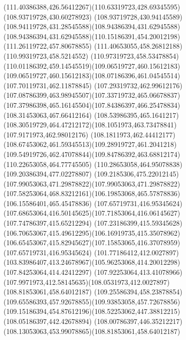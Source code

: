 {{	\curveto(111.40386388,426.56412267)(110.63319723,428.69345595)(108.93719728,430.60278923)
	\curveto(108.93719728,430.94145589)(108.94119728,431.28545588)(108.94386394,431.62945588)
	\curveto(108.94386394,431.62945588)(110.15186391,454.20012198)(111.26119722,457.80678855)
	\lineto(111.40653055,458.26812188)
	\lineto(110.99319723,458.5214552)
	\curveto(110.97319723,458.53478854)(110.01186392,459.14545519)(109.06519727,460.15612183)
	\curveto(109.06519727,460.15612183)(108.07186396,461.04545514)(107.70119731,462.11878845)
	\curveto(107.29319732,462.99612176)(107.08786399,463.98945507)(107.33719732,465.06678837)
	\curveto(107.37986398,465.16145504)(107.84386397,466.25478834)(108.31453063,467.66412164)
	\lineto(108.53986395,465.1641217)
	\curveto(108.30519729,464.47212172)(108.1051973,463.73478841)(107.9171973,462.98012176)
	\curveto(108.1811973,462.44412177)(108.67453062,461.59345513)(109.28919727,461.2041218)
	\curveto(109.54919726,462.47078844)(109.84786392,463.68812174)(110.22653058,464.77745505)
	\lineto(110.28653058,464.95078838)
	\lineto(109.20386394,477.02278807)
	\curveto(109.2185306,475.22012145)(107.99053063,471.29878822)(107.99053063,471.29878822)
	\curveto(107.58253064,468.83212161)(106.19853068,465.57878836)(106.15586401,465.45478836)
	\moveto(107.65719731,416.95345624)
	\curveto(107.68653064,416.50145625)(107.71853064,416.06145627)(107.74786397,415.65212294)
	\curveto(107.23186399,415.59345628)(106.70653067,415.49612295)(106.16919735,415.35078962)
	\curveto(106.65453067,415.82945627)(107.15853065,416.37078959)(107.65719731,416.95345624)
	\moveto(101.77186412,412.0027897)
	\curveto(103.83986407,413.24678967)(105.96253068,414.20012298)(107.84253064,414.42412297)
	\curveto(107.92253064,413.41078966)(107.9971973,412.58145635)(108.0531973,412.0027897)
	\closepath
	\moveto(108.81853061,458.64012187)
	\curveto(109.25586394,458.23878854)(109.65586393,457.92678855)(109.93853058,457.72678856)
	\curveto(109.15186394,454.87612196)(108.52253062,447.38812215)(108.05186397,442.42678894)
	\curveto(108.00786397,446.35212217)(108.13053063,453.99078865)(108.81853061,458.64012187)
}
}
{
}
